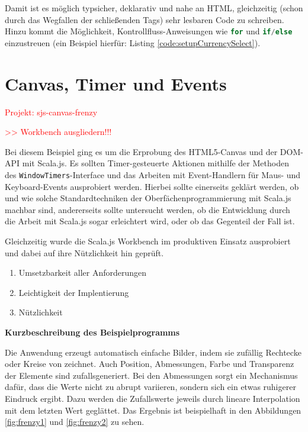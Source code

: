 \documentclass[a4paper, 12pt, hidelinks, listof=totoc, listoftables=totoc, bibliography=totoc]{scrreprt}
\newcommand{\code}[1]{\lstinline[language=Scala, style=inline]|#1|}
\newcommand{\scala}[1]{\lstinline[language=Scala, style=inline]|#1|}
\newcommand{\TODO}[1]{\textcolor{red}{#1}\newline}
\newcommand{\MyMiniSec}[1]{\rmfamily\fontsize{12}{15}\selectfont
	\vspace{7pt}\textbf{#1} %
}
\begin{document}
Damit ist es möglich typsicher, deklarativ und nahe an \ac{HTML}, gleichzeitig (schon durch das Wegfallen der schließenden Tags) sehr lesbaren Code zu schreiben. Hinzu kommt die Möglichkeit, Kontrollfluss-Anweisungen wie \scala{for} und \scala{if/else} einzustreuen (ein Beispiel hierfür: Listing \ref{code:setupCurrencySelect}).



\section{Canvas, Timer und Events}

\TODO{Projekt: sjs-canvas-frenzy}

\TODO{>> Workbench ausgliedern!!!}


Bei diesem Beispiel ging es um die Erprobung des HTML5-Canvas und der \ac{DOM}-\ac{API} mit Scala.js. Es sollten Timer-gesteuerte Aktionen mithilfe der Methoden des \code{WindowTimers}-Interface und das Arbeiten mit Event-Handlern für Maus- und Keyboard-Events ausprobiert werden. Hierbei sollte einerseits geklärt werden, ob und wie solche Standardtechniken der Oberfächenprogrammierung mit Scala.js machbar sind, andererseits sollte untersucht werden, ob die Entwicklung durch die Arbeit mit Scala.js sogar erleichtert wird, oder ob das Gegenteil der Fall ist.

Gleichzeitig wurde die Scala.js Workbench im produktiven Einsatz ausprobiert und dabei auf ihre Nützlichkeit hin geprüft.


\begin{enumerate}
	\item Umsetzbarkeit aller Anforderungen
	\item Leichtigkeit der Implentierung
	\item Nützlichkeit
\end{enumerate}

\MyMiniSec{Kurzbeschreibung des Beispielprogramms}

Die Anwendung erzeugt automatisch einfache Bilder, indem sie zufällig Rechtecke oder Kreise von zeichnet. Auch Position, Abmessungen, Farbe und Transparenz der Elemente sind zufallsgeneriert. Bei den Abmessungen sorgt ein Mechanismus dafür, dass die Werte nicht zu abrupt variieren, sondern sich ein etwas ruhigerer Eindruck ergibt. Dazu werden die Zufallswerte jeweils durch lineare Interpolation mit dem letzten Wert geglättet. Das Ergebnis ist beispielhaft in den Abbildungen \ref{fig:frenzy1} und \ref{fig:frenzy2} zu sehen.
\end{document}
